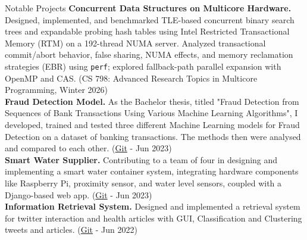 \documentclass{resume} %
\begin{document}
\begin{rSection}{Notable Projects}
\textbf{Concurrent Data Structures on Multicore Hardware.} Designed, implemented, and benchmarked TLE-based concurrent binary search trees and expandable probing hash tables using Intel Restricted Transactional Memory (RTM) on a 192-thread NUMA server. Analyzed transactional commit/abort behavior, false sharing, NUMA effects, and memory reclamation strategies (EBR) using \texttt{perf}; explored fallback-path parallel expansion with OpenMP and CAS. (CS 798: Advanced Research Topics in Multicore Programming, Winter 2026)
\\
\textbf{Fraud Detection Model.} As the Bachelor thesis, titled "Fraud Detection from Sequences of Bank Transactions Using Various Machine Learning Algorithms", I developed, trained and tested three different Machine Learning models for Fraud Detection on a dataset of banking transactions. The methods then were analysed and compared to each other. (\href{https://github.com/kahbodaeini/Fraud-Detection}{Git} - Jun 2023)
\\
\textbf{Smart Water Supplier.} Contributing to a team of four in designing and implementing a smart water container system, integrating hardware
components like Raspberry Pi, proximity sensor, and water level sensors, coupled with a Django-based web app. (\href{https://github.com/Parsa2820/es-project}{Git} - Jun 2023)
\\
\textbf{Information Retrieval System.} Designed and implemented a retrieval system for twitter interaction and health articles with GUI, Classification and Clustering tweets and articles. (\href{https://github.com/IR1401-Spring-Final-Projects/SocialMediaHealth1401-19_39}{Git} - Jun 2022)


\end{rSection}
\end{document}
